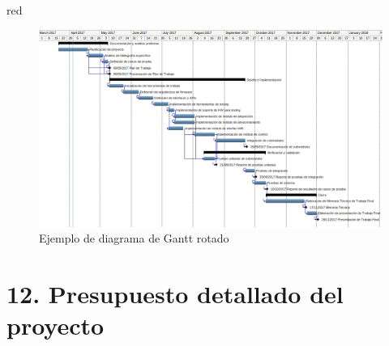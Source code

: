 \documentclass[
11pt, %
codirector, %
]{charter}
\begin{document}
\begin{consigna}{red}
\begin{landscape}
\begin{figure}[htpb]
\centering 
\includegraphics[height=.85\textheight]{./Figuras/Gantt-2.png}
\caption{Ejemplo de diagrama de Gantt rotado}
\label{fig:diagGantt}
\end{figure}

\end{landscape}

\end{consigna}


\section{12. Presupuesto detallado del proyecto}
\label{sec:presupuesto}
\end{document}
